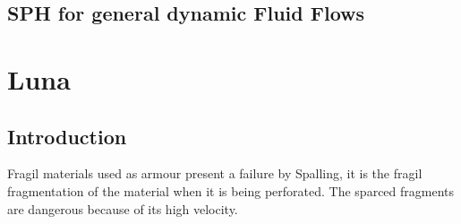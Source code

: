 \documentclass[12pt]{thesis}
\begin{document}
\section{SPH for general dynamic Fluid Flows}


\chapter{Luna}
\section{Introduction}
Fragil materials used as armour present a failure by Spalling, it is the fragil fragmentation of the material when it is being perforated. The sparced fragments are dangerous because of its high velocity.\\ \\
\end{document}
